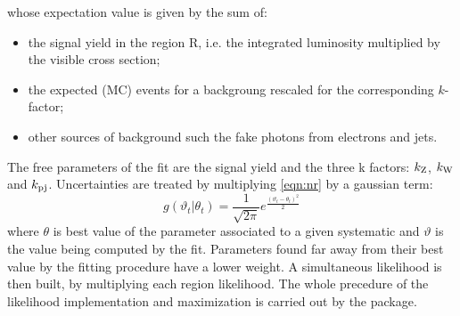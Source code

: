 whose expectation value is given by the sum of:
\begin{itemize}
\item the signal yield in the region R, i.e. the integrated luminosity multiplied by the visible cross section;
\item the expected (MC) events for a backgroung rescaled for the corresponding $k$-factor;
\item other sources of background such the fake photons from electrons and jets.
\end{itemize}

The free parameters of the fit are the signal yield and the three k factors: $k_{\textup{Z}}$, $k_{\textup{W}}$ and $k_{\textup{pj}}$. Uncertainties are treated by multiplying \ref{eqn:nr} by a gaussian term:
\begin{equation}
   g(\vartheta_{t} \vert \theta_{t}) = \frac{1}{\sqrt{2\pi}}e^{\frac{(\vartheta_{t}-\theta_{t})^2}{2} } 
   \label{eqn:gauss}
\end{equation} 
where $\theta$ is best value of the parameter associated to a given systematic and $\vartheta$ is the value being computed by the fit. Parameters found far away from their best value by the fitting procedure have a lower weight. A simultaneous likelihood is then built, by multiplying each region likelihood. The whole precedure of the likelihood implementation and maximization is carried out by the \hf package.



